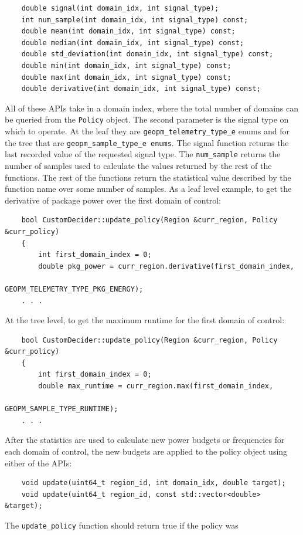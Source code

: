 \documentclass[11pt]{article}
\begin{document}
\begin{verbatim}
    double signal(int domain_idx, int signal_type);
    int num_sample(int domain_idx, int signal_type) const;
    double mean(int domain_idx, int signal_type) const;
    double median(int domain_idx, int signal_type) const;
    double std_deviation(int domain_idx, int signal_type) const;
    double min(int domain_idx, int signal_type) const;
    double max(int domain_idx, int signal_type) const;
    double derivative(int domain_idx, int signal_type) const;
\end{verbatim}
All of these APIs take in a domain index, where the total number of
domains can be queried from the \verb#Policy# object. The second
parameter is the signal type on which to operate. At the leaf they are
\verb#geopm_telemetry_type_e# enums and for the tree that are
\verb#geopm_sample_type_e enums#.  The signal function returns the
last recorded value of the requested signal type.  The
\verb#num_sample# returns the number of samples used to calculate the
values returned by the rest of the functions.  The rest of the
functions return the statistical value described by the function name
over some number of samples.  As a leaf level example, to get the
derivative of package power over the first domain of control:
\begin{verbatim}
    bool CustomDecider::update_policy(Region &curr_region, Policy &curr_policy)
    {
        int first_domain_index = 0;
        double pkg_power = curr_region.derivative(first_domain_index,
                                                  GEOPM_TELEMETRY_TYPE_PKG_ENERGY);
    . . .
\end{verbatim}
At the tree level, to get the maximum runtime for the first domain of
control:
\begin{verbatim}
    bool CustomDecider::update_policy(Region &curr_region, Policy &curr_policy)
    {
        int first_domain_index = 0;
        double max_runtime = curr_region.max(first_domain_index,
                                             GEOPM_SAMPLE_TYPE_RUNTIME);
    . . .
\end{verbatim}
After the statistics are used to calculate new power budgets or
frequencies for each domain of control, the new budgets are applied to
the policy object using either of the APIs:
\begin{verbatim}
    void update(uint64_t region_id, int domain_idx, double target);
    void update(uint64_t region_id, const std::vector<double> &target);
\end{verbatim}
The \verb#update_policy# function should return true if the policy was
\end{document}
